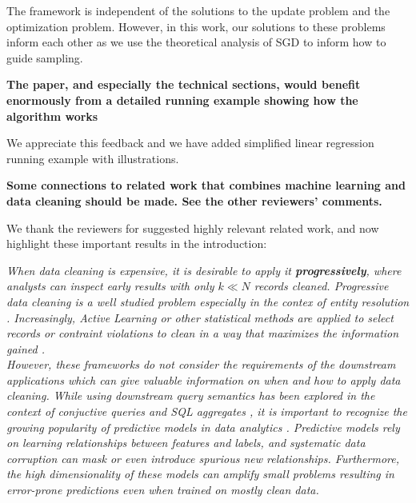The \sys framework is independent of the solutions to the update problem and the optimization problem.
However, in this work, our solutions to these problems inform each other as we use the theoretical analysis of SGD to inform how to guide sampling. 

\vspace{0.25em}

\textbf{The paper, and especially the technical sections, would benefit enormously from a detailed running example showing how the algorithm works}

We appreciate this feedback and we have added simplified linear regression running example with illustrations. 


\vspace{0.25em}

\textbf{Some connections to related work that combines machine learning and data cleaning should be made. See the other reviewers' comments.}

We thank the reviewers for suggested highly relevant related work, and now highlight these important results in the introduction:

\emph{When data cleaning is expensive, it is desirable to apply it \textbf{progressively}, where analysts can inspect early results with only $k \ll N$ records cleaned.
Progressive data cleaning is a well studied problem especially in the contex of entity resolution \cite{whang2014incremental, papenbrock2015progressive, gruenheid2014incremental}.
Increasingly, Active Learning \cite{settles2010active} or other statistical methods are applied to select records or contraint violations to clean in a way that maximizes the information gained \cite{DBLP:journals/pvldb/YakoutENOI11, gokhale2014corleone, yakout2013don}.\\
However, these frameworks do not consider the requirements of the downstream applications which can give valuable information on when and how to apply data cleaning.
While using downstream query semantics has been explored in the context of conjuctive queries \cite{DBLP:conf/sigmod/BergmanMNT15} and SQL aggregates \cite{wang1999sample}, it is important to recognize the growing popularity of predictive models in data analytics \cite{bdas, alexandrov2014stratosphere, crotty2014tupleware, hellerstein2012madlib}.
Predictive models rely on learning relationships between features and labels, and systematic data corruption \cite{taylor1982introduction} can mask or even introduce spurious new relationships.
Furthermore, the high dimensionality of these models can amplify small problems \cite{xiaofeature} resulting in error-prone predictions even when trained on mostly clean data.}

